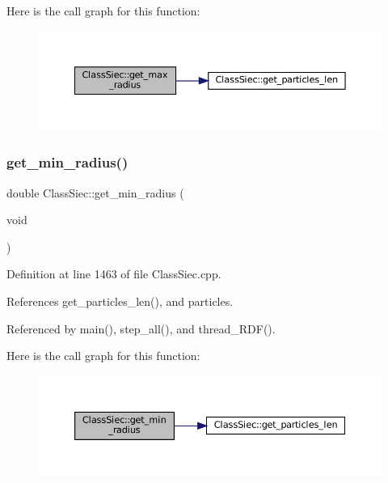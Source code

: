 Here is the call graph for this function\+:
\nopagebreak
\begin{figure}[H]
\begin{center}
\leavevmode
\includegraphics[width=350pt]{classClassSiec_a078c088fe48696423cc5c6c429d45eab_cgraph}
\end{center}
\end{figure}
\mbox{\label{classClassSiec_ab17d2e44f433cb4aec5d965b158a60a1}} 
\subsubsection{\texorpdfstring{get\+\_\+min\+\_\+radius()}{get\_min\_radius()}}
{\footnotesize\ttfamily double Class\+Siec\+::get\+\_\+min\+\_\+radius (\begin{DoxyParamCaption}\item[{void}]{ }\end{DoxyParamCaption})}



Definition at line 1463 of file Class\+Siec.\+cpp.



References get\+\_\+particles\+\_\+len(), and particles.



Referenced by main(), step\+\_\+all(), and thread\+\_\+\+R\+D\+F().

Here is the call graph for this function\+:
\nopagebreak
\begin{figure}[H]
\begin{center}
\leavevmode
\includegraphics[width=350pt]{classClassSiec_ab17d2e44f433cb4aec5d965b158a60a1_cgraph}
\end{center}
\end{figure}
\mbox{\label{classClassSiec_a1f8a44832453567a2eeed85fe038ca01}} 
